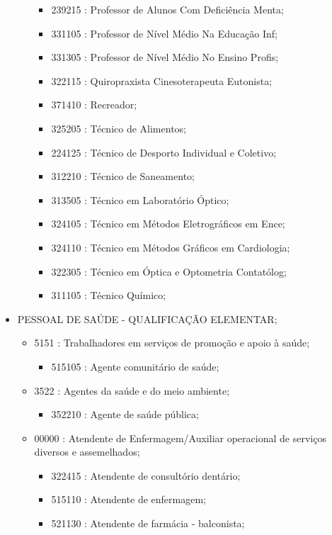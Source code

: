 \begin{itemize}
\begin{itemize}
\begin{itemize}
      \item 239215 : Professor de Alunos Com Deficiência Menta;
      \item 331105 : Professor de Nível Médio Na Educação Inf;
      \item 331305 : Professor de Nível Médio No Ensino Profis;
      \item 322115 : Quiropraxista Cinesoterapeuta Eutonista;
      \item 371410 : Recreador;
      \item 325205 : Técnico de Alimentos;
      \item 224125 : Técnico de Desporto Individual e Coletivo;
      \item 312210 : Técnico de Saneamento;
      \item 313505 : Técnico em Laboratório Óptico;
      \item 324105 : Técnico em Métodos Eletrográficos em Ence;
      \item 324110 : Técnico em Métodos Gráficos em Cardiologia;
      \item 322305 : Técnico em Óptica e Optometria Contatólog;
      \item 311105 : Técnico Químico;
    \end{itemize}
  \end{itemize}
  \item PESSOAL DE SAÚDE - QUALIFICAÇÃO ELEMENTAR;
  \begin{itemize}
    \item 5151 : Trabalhadores em serviços de promoção e apoio à saúde;
    \begin{itemize}
      \item 515105 : Agente comunitário de saúde;
    \end{itemize}
    \item 3522 : Agentes da saúde e do meio ambiente;
    \begin{itemize}
      \item 352210 : Agente de saúde pública;
    \end{itemize}
    \item 00000 : Atendente de Enfermagem/Auxiliar operacional de serviços diversos e assemelhados;
    \begin{itemize}
      \item 322415 : Atendente de consultório dentário;
      \item 515110 : Atendente de enfermagem;
      \item 521130 : Atendente de farmácia - balconista;
    \end{itemize}

\end{itemize}
\end{itemize}
